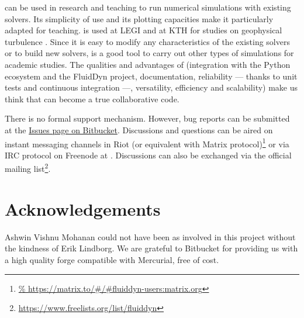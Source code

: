 
 can be used in research and teaching to run numerical simulations
with existing solvers.
%
Its simplicity of use and its plotting capacities make it particularly adapted for
teaching.
%
 is used at LEGI and at KTH for studies on geophysical turbulence
\cite[see for example][]{LindborgMohanan2017}.
%
Since it is easy to modify any characteristics of the existing solvers or to build
new solvers,  is a good tool to carry out other types of
simulations for academic studies.
%
The qualities and advantages of  (integration with the Python
ecosystem and the FluidDyn project, documentation, reliability --- thanks to unit tests
and continuous integration ---, versatility, efficiency and scalability) make us think
that  can become a true collaborative code.

There is no formal support mechanism. However, bug reports can be submitted at
the \href{https://bitbucket.org/fluiddyn/fluidsim/issues}{Issues page on
Bitbucket}. Discussions and questions can be aired on instant messaging
channels in Riot (or equivalent with Matrix protocol)\footnote{
\url{%
  https://matrix.to/\#/\#fluiddyn-users:matrix.org}}
or via IRC protocol on Freenode at . Discussions
can also be exchanged via the official mailing list\footnote{
\url{https://www.freelists.org/list/fluiddyn}}.

\section{Acknowledgements}


Ashwin Vishnu Mohanan could not have been as involved in this project without the
kindness of Erik Lindborg.
%
We are grateful to Bitbucket for providing us with a high quality forge
compatible with Mercurial, free of cost.

